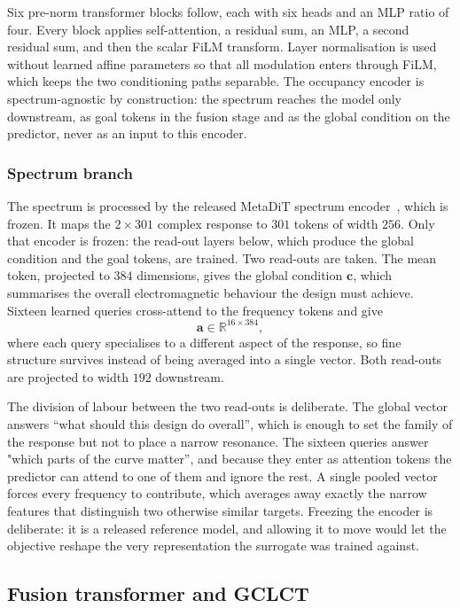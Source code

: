 \documentclass[pdflatex,oneside,sn-mathphys-num]{sn-jnl}
\theoremstyle{thmstyleone}
\theoremstyle{thmstyletwo}
\theoremstyle{thmstylethree}
\begin{document}
Six pre-norm transformer blocks follow, each with six heads and an MLP ratio of four.
Every block applies self-attention, a residual sum, an MLP, a second residual sum, and
then the scalar FiLM transform. Layer normalisation is used without learned affine
parameters so that all modulation enters through FiLM, which keeps the two conditioning
paths separable. The occupancy encoder is spectrum-agnostic by construction: the spectrum reaches the
model only downstream, as goal tokens in the fusion stage and as the global condition on
the predictor, never as an input to this encoder.

\subsubsection{Spectrum branch}
The spectrum is processed by the released MetaDiT spectrum encoder~\cite{metadit},
which is frozen. It maps the $2\times301$ complex response to $301$ tokens of width
$256$. Only that encoder is frozen: the read-out layers below, which produce the global
condition and the goal tokens, are trained. Two read-outs are taken. The mean token, projected to $384$ dimensions, gives
the global condition $\mathbf{c}$, which summarises the overall electromagnetic
behaviour the design must achieve. Sixteen learned queries cross-attend to the frequency
tokens and give
\begin{equation}
\mathbf{a} \in \mathbb{R}^{16\times384},
\end{equation}
where each query specialises to a
different aspect of the response, so fine structure survives instead of being averaged
into a single vector. Both read-outs are projected to width $192$ downstream.

The division of labour between the two read-outs is deliberate. The global vector
answers ``what should this design do overall'', which is enough to set the family
of the response but not to place a narrow resonance. The sixteen queries answer
"which parts of the curve matter'', and because they enter as attention tokens the
predictor can attend to one of them and ignore the rest. A single pooled vector
forces every frequency to contribute, which averages away exactly the narrow
features that distinguish two otherwise similar targets. Freezing
the encoder is deliberate: it is a released reference model, and allowing it to move
would let the objective reshape the very representation the surrogate was trained
against.

\subsection{Fusion transformer and GCLCT}
\end{document}
